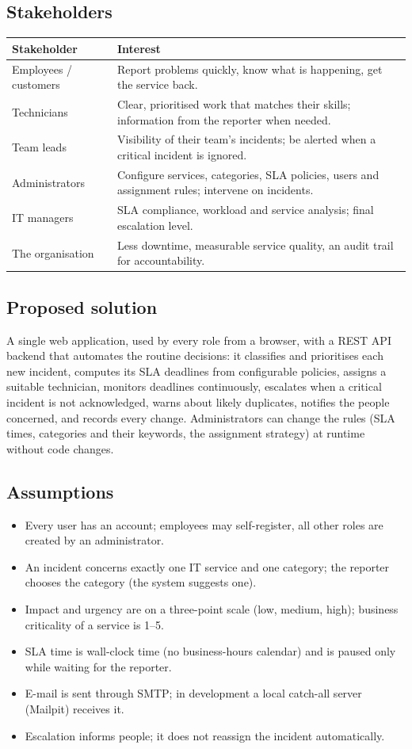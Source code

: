 \documentclass[11pt,a4paper]{article}
\begin{document}
\subsection{Stakeholders}
\begin{tabularx}{\linewidth}{@{}lX@{}}
\toprule
\textbf{Stakeholder} & \textbf{Interest} \\ \midrule
Employees / customers & Report problems quickly, know what is happening, get the service back. \\
Technicians & Clear, prioritised work that matches their skills; information from the reporter when needed. \\
Team leads & Visibility of their team's incidents; be alerted when a critical incident is ignored. \\
Administrators & Configure services, categories, SLA policies, users and assignment rules; intervene on incidents. \\
IT managers & SLA compliance, workload and service analysis; final escalation level. \\
The organisation & Less downtime, measurable service quality, an audit trail for accountability. \\ \bottomrule
\end{tabularx}

\subsection{Proposed solution}
A single web application, used by every role from a browser, with a REST API backend that automates the routine decisions: it classifies and prioritises each new incident, computes its SLA deadlines from configurable policies, assigns a suitable technician, monitors deadlines continuously, escalates when a critical incident is not acknowledged, warns about likely duplicates, notifies the people concerned, and records every change. Administrators can change the rules (SLA times, categories and their keywords, the assignment strategy) at runtime without code changes.

\subsection{Assumptions}
\begin{itemize}
\item Every user has an account; employees may self-register, all other roles are created by an administrator.
\item An incident concerns exactly one IT service and one category; the reporter chooses the category (the system suggests one).
\item Impact and urgency are on a three-point scale (low, medium, high); business criticality of a service is 1–5.
\item SLA time is wall-clock time (no business-hours calendar) and is paused only while waiting for the reporter.
\item E-mail is sent through SMTP; in development a local catch-all server (Mailpit) receives it.
\item Escalation informs people; it does not reassign the incident automatically.
\end{itemize}
\end{document}
